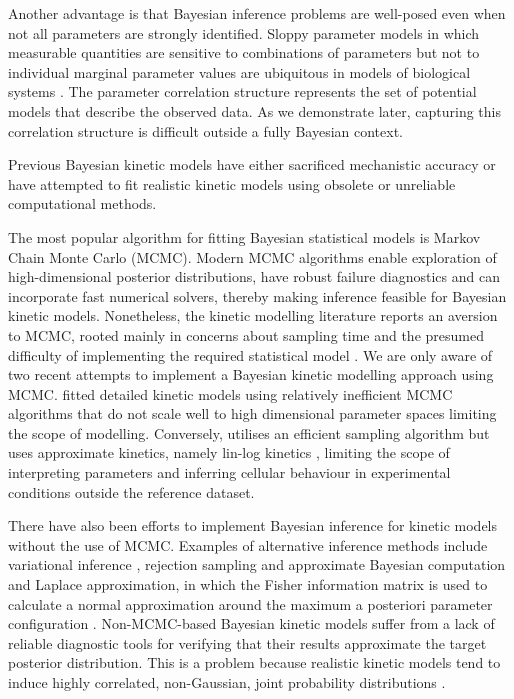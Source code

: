 \documentclass[journal=asbcd6,manuscript=article,layout=traditional]{achemso}
\begin{document}
Another advantage is that Bayesian inference problems are well-posed
even when not all parameters are strongly identified. Sloppy parameter
models in which measurable quantities are sensitive to combinations of
parameters but not to individual marginal parameter values are
ubiquitous in models of biological systems
\citep{gutenkunst_2007, white_2016}. The parameter correlation structure
represents the set of potential models that describe the observed data.
As we demonstrate later, capturing this correlation structure is
difficult outside a fully Bayesian context.

Previous Bayesian kinetic models have either sacrificed mechanistic
accuracy or have attempted to fit realistic kinetic models using
obsolete or unreliable computational methods.

The most popular algorithm for fitting Bayesian statistical models is
Markov Chain Monte Carlo (MCMC). Modern MCMC algorithms enable
exploration of high-dimensional posterior distributions, have robust
failure diagnostics
\citep{vehtariRankNormalizationFoldingLocalization2021} and can
incorporate fast numerical solvers, thereby making inference feasible
for Bayesian kinetic models. Nonetheless, the kinetic modelling
literature reports an aversion to MCMC, rooted mainly in concerns about
sampling time and the presumed difficulty of implementing the required
statistical model \citep{raue_joining_2013, saa_construction_2016}. We
are only aware of two recent attempts to implement a Bayesian kinetic
modelling approach using MCMC. \citet{stapor_pesto_2018} fitted detailed
kinetic models using relatively inefficient MCMC algorithms that do not
scale well to high dimensional parameter spaces limiting the scope of
modelling. Conversely, \citet{st.johnBayesianInferenceMetabolic2018}
utilises an efficient sampling algorithm but uses approximate kinetics,
namely lin-log kinetics \citep{visser_dynamic_2003}, limiting the scope
of interpreting parameters and inferring cellular behaviour in
experimental conditions outside the reference dataset.

There have also been efforts to implement Bayesian inference for kinetic
models without the use of MCMC. Examples of alternative inference
methods include variational inference
\citep{st.johnBayesianInferenceMetabolic2018}, rejection sampling and
approximate Bayesian computation \citep{saa_construction_2016} and
Laplace approximation, in which the Fisher information matrix is used to
calculate a normal approximation around the maximum a posteriori
parameter configuration
\citep{liebermeister_model_2021, gopalakrishnan_k-fit_2020, stapor_pesto_2018, raue_joining_2013}.
Non-MCMC-based Bayesian kinetic models suffer from a lack of reliable
diagnostic tools for verifying that their results approximate the target
posterior distribution. This is a problem because realistic kinetic
models tend to induce highly correlated, non-Gaussian, joint probability
distributions \citep{gutenkunst_2007, stapor_pesto_2018}.
\end{document}
